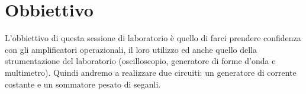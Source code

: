 \section*{Obbiettivo}

L'obbiettivo di questa sessione di laboratorio è quello di farci prendere confidenza con gli amplificatori operazionali, il loro utilizzo ed anche quello della strumentazione del laboratorio (oscilloscopio, generatore di forme d'onda e multimetro). Quindi andremo a realizzare due circuiti: un generatore di corrente costante e un sommatore pesato di seganli.

